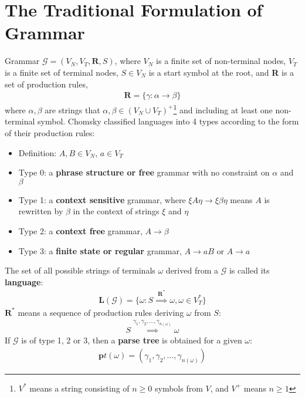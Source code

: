 \documentclass[../Notes_of_CaRiVaC.tex]{subfiles}
\begin{document}
\section{The Traditional Formulation of Grammar}%
\label{sec:ii.1.2}
Grammar $\mathcal{G} = (V_N, V_T, \mathbf{R}, S)$, where $V_N$ is a finite
set of non-terminal nodes, $V_T$ is a finite set of terminal nodes, $S \in V_N$
is a start symbol at the root, and \textbf{R} is a set of production rules,
%
\begin{align}
  \label{eq:ii.1.2}
  \mathbf{R} = \{\gamma: \alpha \to \beta\}
\end{align}
%
where $\alpha, \beta$ are strings that
$\alpha, \beta \in {(V_N \cup V_T)}^+$\footnote{$V^*$ means a string consisting
of $n \geq 0$ symbols from $V$, and $V^+$ means $n \geq 1$} and including at
least one non-terminal symbol. Chomsky classified languages into 4 types
according to the form of their production rules:
%
\begin{itemize}
  \item Definition: $A, B \in V_N$, $a \in V_T$
  \item Type 0: a \textbf{phrase structure or free} grammar with no constraint
    on $\alpha$ and $\beta$
  \item Type 1: a \textbf{context sensitive} grammar, where
    $\xi A \eta \to \xi \beta \eta$ means $A$ is rewritten by $\beta$
    in the context of strings $\xi$ and $\eta$
  \item Type 2: a \textbf{context free} grammar, $A \to \beta$
  \item Type 3: a \textbf{finite state or regular} grammar,
    $A \to aB$ or $A \to a$
\end{itemize}
%

The set of all possible strings of terminals $\omega$ derived from a
$\mathcal{G}$ is called its \textbf{language}:
%
\begin{align}
  \label{eq:ii.1.3}
  \mathbf{L}(\mathcal{G}) = \{\omega: S \overset{\mathbf{R^*}}{\implies} \omega, \omega \in V^*_T\}
\end{align}
%
$\mathbf{R^*}$ means a sequence of production rules deriving $\omega$ from $S$:
%
\begin{align}
  \label{eq:ii.1.4}
  S \overset{\gamma_1, \gamma_2, \ldots, \gamma_{n(\omega)}}{\implies} \omega
\end{align}
%
If $\mathcal{G}$ is of type 1, 2 or 3, then a \textbf{parse tree} is obtained
for a given $\omega$:
%
\begin{align}
  \label{eq:ii.1.5}
  \mathbf{p}t(\omega) = (\gamma_1, \gamma_2, \ldots, \gamma_{n(\omega)})
\end{align}
%
\end{document}
